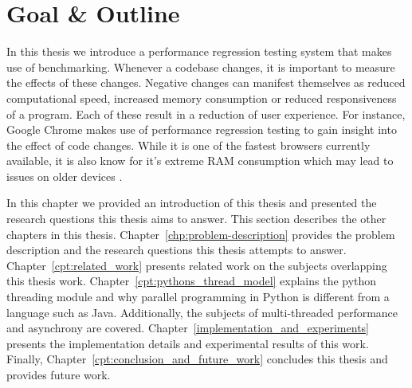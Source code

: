 

\section{Goal \& Outline}
In this thesis we introduce a performance regression testing system that makes use of benchmarking.
Whenever a codebase changes, it is important to measure the effects of these changes.
Negative changes can manifest themselves as reduced computational speed, increased memory consumption or reduced responsiveness of a program.
Each of these result in a reduction of user experience.
For instance, Google Chrome makes use of performance regression testing to gain insight into the effect of code changes.
While it is one of the fastest browsers currently available, it is also know for it's extreme RAM consumption which may lead to issues on older devices \cite{ram2012chrome}.

In this chapter we provided an introduction of this thesis and presented the research questions this thesis aims to answer. 
This section describes the other chapters in this thesis.
Chapter~\ref{chp:problem-description} provides the problem description and the research questions this thesis attempts to answer.
Chapter~\ref{cpt:related_work} presents related work on the subjects overlapping this thesis work.
Chapter~\ref{cpt:pythons_thread_model} explains the python threading module and why parallel programming in Python is different from a language such as Java. Additionally, the subjects of multi-threaded performance and asynchrony are covered.
Chapter~\ref{implementation_and_experiments} presents the implementation details and experimental results of this work.
Finally, Chapter~\ref{cpt:conclusion_and_future_work} concludes this thesis and provides future work.
